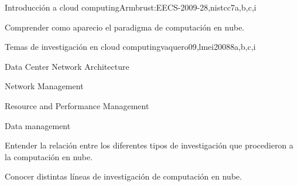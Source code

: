 \begin{syllabus}
\begin{unit}{Introducción a cloud computing}{Armbrust:EECS-2009-28,nistcc}{7}{a,b,c,i}
   \begin{topics}
        \item \ARDistributedArchitecturesTopicNetwork%
        \item \SESpecializedSystemsTopicClient%
        \item \SESpecializedSystemsTopicDistributed%
        \item \SESpecializedSystemsTopicParallel%
        \item \SESpecializedSystemsTopicWeb%
   \end{topics}

   \begin{unitgoals}
        \item \ARDistributedArchitecturesObjSIX%
        \item \SESpecializedSystemsObjONE%
        \item \SESpecializedSystemsObjFIVE%
        \item Comprender como aparecio el paradigma de computación en nube.
   \end{unitgoals}
\end{unit}

\begin{unit}{Temas de investigación en cloud computing}{vaquero09,lmei2008}{8}{a,b,c,i}
   \begin{topics}
        \item Data Center Network Architecture
        \item Network Management
        \item Resource and Performance Management
        \item Data management
   \end{topics}

   \begin{unitgoals}
        \item Entender la relación entre los diferentes tipos de investigación que procedieron a la computación en nube.
        \item Conocer distintas líneas de investigación de computación en nube.
   \end{unitgoals}
\end{unit}


\end{syllabus}
